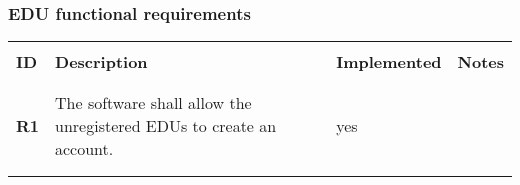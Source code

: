\subsubsection*{EDU functional requirements}
\renewcommand{\arraystretch}{0.5}
\begin{longtable}[H]{l p{8cm} l p{2cm}}
    \hline
                 &                                                                                                                                                                                                                                                                          &                      &                                                                                         \\
    \textbf{ID}  & \textbf{Description}                                                                                                                                                                                                                                                     & \textbf{Implemented} & \textbf{Notes}                                                                          \\
                 &                                                                                                                                                                                                                                                                          &                      &                                                                                         \\\hline & & & \\
    \textbf{R1}  & The software shall allow the unregistered EDUs to create an account.                                                                                                                                                                                                     & {\color{green}yes}   &                                                                                         \\
                 &                                                                                                                                                                                                                                                                          &                      &                                                                                         \\\hline & & & \\

\end{longtable}
